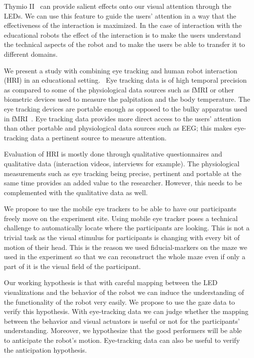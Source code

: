 \documentclass{sig-alternate}
\begin{document}
Thymio II~\cite{riedo2012two} can provide salient effects onto our visual
attention through the LEDs. We can use this feature to guide the users'
attention in a way that the effectiveness of the interaction is maximized. In
the case of interaction with the educational robots the effect of the
interaction is to make the users understand the technical aspects of the robot
and to make the users be able to transfer it to different domains.

We present a study with combining eye tracking and human robot interaction (HRI)
in an educational setting. ~Eye tracking data is of high temporal precision as
compared to some of the physiological data sources such as fMRI or other
biometric devices used to measure the palpitation and the body temperature. The
eye tracking devices are portable enough as opposed to the bulky apparatus used
in fMRI~\cite{rosenthal2013neural}.  Eye tracking data provides more direct
access to the users' attention than other portable and physiological data
sources such as EEG; this makes eye-tracking data a pertinent source to measure
attention.

Evaluation of HRI is mostly done through qualitative questionnaires and
qualitative data (interaction videos, interviews for example). The physiological
measurements such as eye tracking being precise, pertinent and portable at the
same time provides an added value to the researcher.  However, this needs to be
complemented with the qualitative data as well.

We propose to use the mobile eye trackers to be able to have our participants
freely move on the experiment site. Using mobile eye tracker poses a technical
challenge to automatically locate where the participants are looking. This is
not a trivial task as the visual stimulus for participants is changing with
every bit of motion of their head. This is the reason we used fiducial-markers
on the maze we used in the experiment so that we can reconstruct the whole maze
even if only a part of it is the visual field of the participant.

Our working hypothesis is that with careful mapping between the LED
visualizations and the behavior of the robot we can induce the understanding of
the functionality of the robot very easily. We propose to use the gaze data to
verify this hypothesis. With eye-tracking data we can judge whether the mapping
between the behavior and visual actuators is useful or not for the participants'
understanding.  Moreover, we hypothesize that the good performers will be able
to anticipate the robot's motion. Eye-tracking data can also be useful to verify
the anticipation hypothesis.
\end{document}
